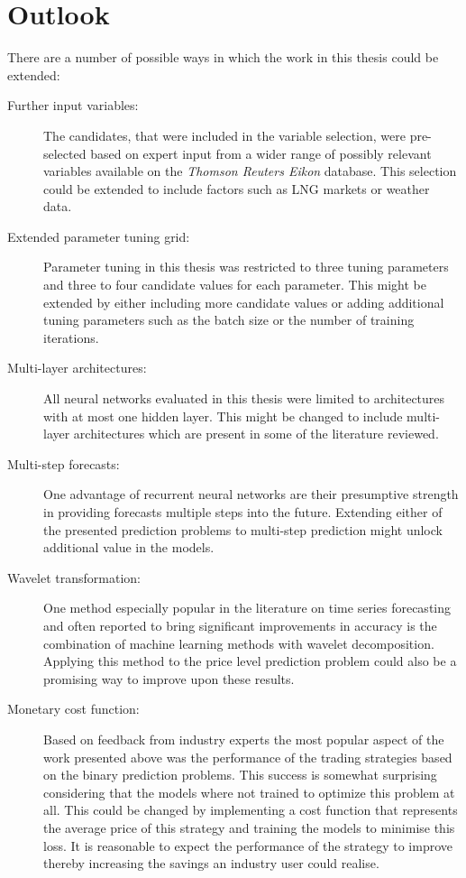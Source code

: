 \section{Outlook}
There are a number of possible ways in which the work in this thesis could be extended:
\begin{description}
\item[Further input variables:] The candidates, that were included in the variable selection, were pre-selected based on expert input from a wider range of possibly relevant variables available on the \textit{Thomson Reuters Eikon} database. This selection could be extended to include factors such as LNG markets or weather data. 
\item[Extended parameter tuning grid:] Parameter tuning in this thesis was restricted to three tuning parameters and three to four candidate values for each parameter. This might be extended by either including more candidate values or adding additional tuning parameters such as the batch size or the number of training iterations.
\item[Multi-layer architectures:] All neural networks evaluated in this thesis were limited to architectures with at most one hidden layer. This might be changed to include multi-layer architectures which are present in some of the literature reviewed. 
\item[Multi-step forecasts:] One advantage of recurrent neural networks are their presumptive strength in providing forecasts multiple steps into the future. Extending either of the presented prediction problems to multi-step prediction might unlock additional value in the models.
\item[Wavelet transformation:] One method especially popular in the literature on time series forecasting and often reported to bring significant improvements in accuracy is the combination of machine learning methods with wavelet decomposition. Applying this method to the price level prediction problem could also be a promising way to improve upon these results.
\item[Monetary cost function:] Based on feedback from industry experts the most popular aspect of the work presented above was the performance of the trading strategies based on the binary prediction problems. This success is somewhat surprising considering that the models where not trained to optimize this problem at all. This could be changed by implementing a cost function that represents the average price of this strategy and training the models to minimise this loss. It is reasonable to expect the performance of the strategy to improve thereby increasing the savings an industry user could realise.
\end{description}
